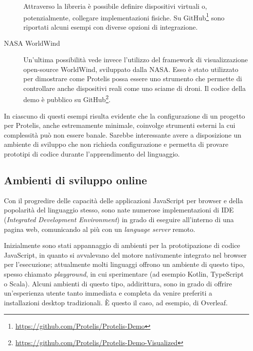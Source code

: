 \begin{description}
      Attraverso la libreria è possibile definire dispositivi virtuali o, potenzialmente, collegare implementazioni fisiche.
      Su GitHub\footnote{\url{https://github.com/Protelis/Protelis-Demo}} sono riportati alcuni esempi con diverse opzioni di integrazione.

    \item[NASA WorldWind]\cite{4161692}
      Un'ultima possibilità vede invece l'utilizzo del framework di visualizzazione open-source WorldWind, sviluppato dalla NASA\@.
      Esso è stato utilizzato per dimostrare come Protelis possa essere uno strumento che permette di controllare anche dispositivi reali come uno sciame di droni.
      Il codice della demo è pubblico su GitHub\footnote{\url{https://github.com/Protelis/Protelis-Demo-Visualized}}.
  \end{description}

  In ciascuno di questi esempi risulta evidente che la configurazione di un progetto per Protelis, anche estremamente minimale, coinvolge strumenti esterni la cui complessità può non essere banale.
  Sarebbe interessante avere a disposizione un ambiente di sviluppo che non richieda configurazione e permetta di provare prototipi di codice durante l'apprendimento del linguaggio.

  \subsection{Ambienti di sviluppo online}\label{subsec:online-ide}

  Con il progredire delle capacità delle applicazioni JavaScript per browser e della popolarità del linguaggio stesso, sono nate numerose implementazioni di IDE (\emph{Integrated Development Environment}) in grado di eseguire all'interno di una pagina web, comunicando al più con un \emph{language server} remoto.

  Inizialmente sono stati appannaggio di ambienti per la prototipazione di codice JavaScript, in quanto si avvalevano del motore nativamente integrato nel browser per l'esecuzione;
  attualmente molti linguaggi offrono un ambiente di questo tipo, spesso chiamato \emph{playground}, in cui sperimentare (ad esempio Kotlin, TypeScript o Scala).
  Alcuni ambienti di questo tipo, addirittura, sono in grado di offrire un'esperienza utente tanto immediata e completa da venire preferiti a installazioni desktop tradizionali.
  È questo il caso, ad esempio, di Overleaf. 

